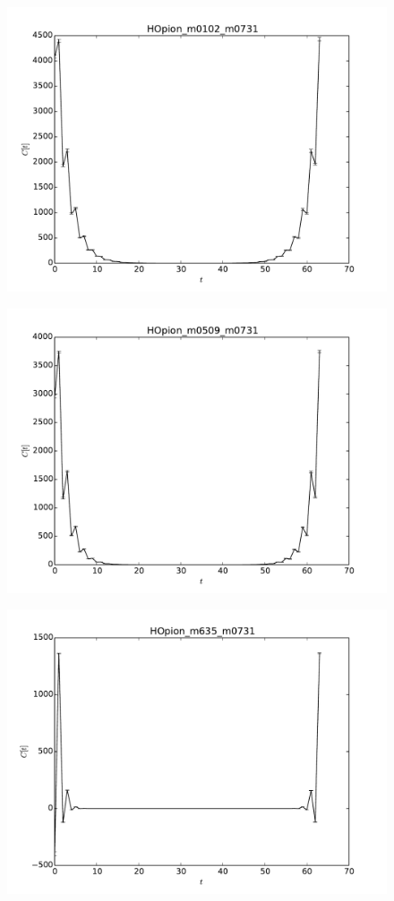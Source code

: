 \documentclass[11pt,a4paper]{article}
\begin{document}
 
  \begin{figure}[h]
 \centering
 \includegraphics[width=.8\textwidth]{HOpion_m0102_m0731.pdf}
 \caption{}
 \end{figure}
 
 \begin{figure}[h]
 \centering
 \includegraphics[width=.8\textwidth]{HOpion_m0509_m0731.pdf}
 \caption{}
 \end{figure}
 
  \begin{figure}[h]
 \centering
 \includegraphics[width=.8\textwidth]{HOpion_m635_m0731.pdf}
 \caption{}
 \end{figure}
 
\end{document}
